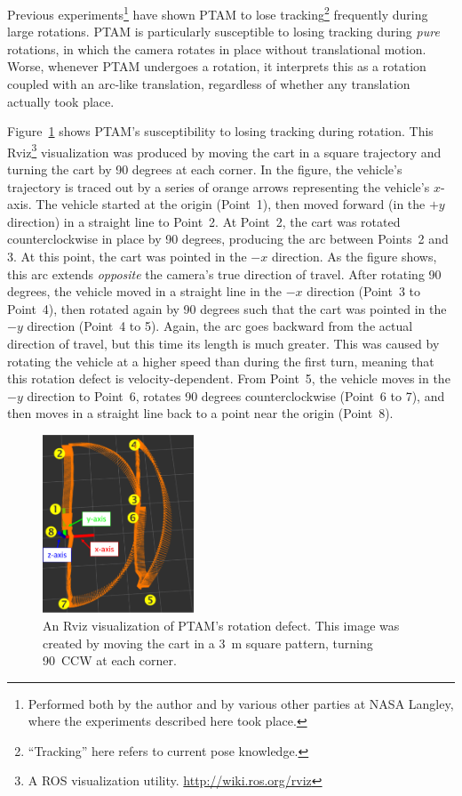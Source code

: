 Previous experiments\footnote{Performed both by the author and by various other parties at NASA Langley, where the experiments described here took place.} have shown PTAM to lose tracking\footnote{``Tracking'' here refers to current pose knowledge.} frequently during large rotations. PTAM is particularly susceptible to losing tracking during \textit{pure} rotations, in which the camera rotates in place without translational motion. Worse, whenever PTAM undergoes a rotation, it interprets this as a rotation coupled with an arc-like translation, regardless of whether any translation actually took place.

Figure~\ref{fig:rot_bug_rviz} shows PTAM's susceptibility to losing tracking during rotation. This Rviz\footnote{A ROS visualization utility. \url{http://wiki.ros.org/rviz}} visualization was produced by moving the cart in a square trajectory and turning the cart by 90 degrees at each corner. In the figure, the vehicle's trajectory is traced out by a series of orange arrows representing the vehicle's $x$-axis. The vehicle started at the origin (Point~1), then moved forward (in the $+y$ direction) in a straight line to Point~2. At Point~2, the cart was rotated counterclockwise in place by 90 degrees, producing the arc between Points~2 and 3. At this point, the cart was pointed in the $-x$ direction. As the figure shows, this arc extends \textit{opposite} the camera's true direction of travel. After rotating 90 degrees, the vehicle moved in a straight line in the $-x$ direction (Point~3 to Point~4), then rotated again by 90 degrees such that the cart was pointed in the $-y$ direction (Point~4 to 5). Again, the arc goes backward from the actual direction of travel, but this time its length is much greater. This was caused by rotating the vehicle at a higher speed than during the first turn, meaning that this rotation defect is velocity-dependent. From Point~5, the vehicle moves in the $-y$ direction to Point~6, rotates 90 degrees counterclockwise (Point~6 to 7), and then moves in a straight line back to a point near the origin (Point~8).

\begin{figure}[t]
\centering
    \includegraphics[width=0.4\textwidth]{rot_bug_rviz}
  \caption[Rviz Visualization of Rotational Distortion]{An Rviz visualization of PTAM's rotation defect. This image was created by moving the cart in a 3~m square pattern, turning 90\textdegree\ CCW at each corner.}
  \label{fig:rot_bug_rviz}
\end{figure}

